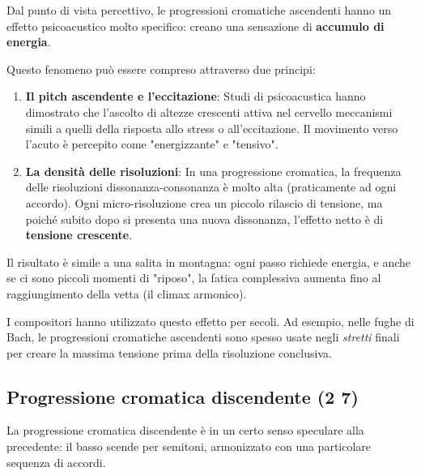 \begin{fisica}
	Dal punto di vista percettivo, le progressioni cromatiche ascendenti hanno un effetto psicoacustico molto specifico: creano una sensazione di \textbf{accumulo di energia}.
	
	Questo fenomeno può essere compreso attraverso due principi:
	
	\begin{enumerate}
		\item \textbf{Il pitch ascendente e l'eccitazione}: Studi di psicoacustica hanno dimostrato che l'ascolto di altezze crescenti attiva nel cervello meccanismi simili a quelli della risposta allo stress o all'eccitazione. Il movimento verso l'acuto è percepito come "energizzante" e "tensivo".
		
		\item \textbf{La densità delle risoluzioni}: In una progressione cromatica, la frequenza delle risoluzioni dissonanza-consonanza è molto alta (praticamente ad ogni accordo). Ogni micro-risoluzione crea un piccolo rilascio di tensione, ma poiché subito dopo si presenta una nuova dissonanza, l'effetto netto è di \textbf{tensione crescente}.
	\end{enumerate}
	
	Il risultato è simile a una salita in montagna: ogni passo richiede energia, e anche se ci sono piccoli momenti di "riposo", la fatica complessiva aumenta fino al raggiungimento della vetta (il climax armonico).
	
	I compositori hanno utilizzato questo effetto per secoli. Ad esempio, nelle fughe di Bach, le progressioni cromatiche ascendenti sono spesso usate negli \textit{stretti} finali per creare la massima tensione prima della risoluzione conclusiva.
\end{fisica}

\subsection{Progressione cromatica discendente (2 7)}
\label{subsec:progressione_cromatica_discendente}

La progressione cromatica discendente è in un certo senso speculare alla precedente: il basso scende per semitoni, armonizzato con una particolare sequenza di accordi.

